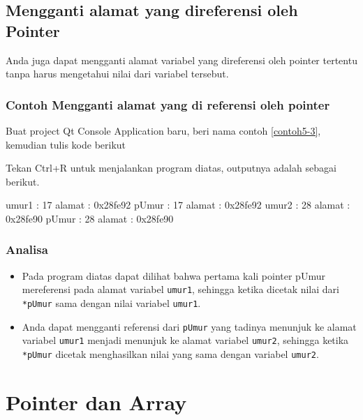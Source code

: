 \subsection{Mengganti alamat yang direferensi oleh
Pointer}\label{mengganti-alamat-yang-direferensi-oleh-pointer}

Anda juga dapat mengganti alamat variabel yang direferensi oleh pointer
tertentu tanpa harus mengetahui nilai dari variabel tersebut.

\subsubsection*{Contoh Mengganti alamat yang di referensi oleh pointer}

Buat project Qt Console Application baru, beri nama contoh \ref{contoh5-3}, kemudian
tulis kode berikut



Tekan Ctrl+R untuk menjalankan program diatas, outputnya adalah sebagai
berikut.

\begin{lcverbatim}
umur1 : 17 alamat : 0x28fe92
pUmur : 17 alamat : 0x28fe92
umur2 : 28 alamat : 0x28fe90
pUmur : 28 alamat : 0x28fe90
\end{lcverbatim}

\subsubsection*{Analisa}

\begin{itemize}

\item
 Pada program diatas dapat dilihat bahwa pertama kali pointer pUmur
 mereferensi pada alamat variabel \texttt{umur1}, sehingga ketika
 dicetak nilai dari \texttt{*pUmur} sama dengan nilai variabel
 \texttt{umur1}.
\item
 Anda dapat mengganti referensi dari \texttt{pUmur} yang tadinya
 menunjuk ke alamat variabel \texttt{umur1} menjadi menunjuk ke alamat
 variabel \texttt{umur2}, sehingga ketika \texttt{*pUmur} dicetak
 menghasilkan nilai yang sama dengan variabel \texttt{umur2}.
\end{itemize}

\section{Pointer dan Array}\label{pointer-dan-array}

